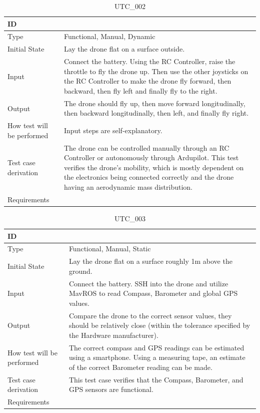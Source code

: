 \documentclass[12pt, titlepage]{article}
\begin{document}
\begin{table}[!h]
\begin{center}
\caption {UTC\_002}
\label{tab:UTC_002}
\begin{tabular}{ | m{3.2cm} | m{12.2cm} | } 
\hline
ID & \nameref{tab:UTC_002} \\ 
\hline
Type &  Functional, Manual, Dynamic  \\ 
\hline
Initial State & Lay the drone flat on a surface outside.\\ 
\hline
Input & Connect the battery. Using the RC Controller, raise the throttle to fly the drone up. Then use the other joysticks on the RC Controller to make the drone fly forward, then backward, then fly left and finally fly to the right.
 \\ 
\hline
Output &  The drone should fly up, then move forward longitudinally, then backward longitudinally, then left, and finally fly right.\\ 
\hline
How test will be performed & Input steps are self-explanatory. \\ 
\hline
Test case derivation & The drone can be controlled manually through an RC Controller or autonomously through Ardupilot. This test verifies the drone's mobility, which is mostly dependent on the electronics being connected correctly and the drone having an aerodynamic mass distribution.   \\ 
\hline
Requirements &  \\ 
\hline
\end{tabular}
\end{center}
\end{table}


\begin{table}[!h]
\begin{center}
\caption {UTC\_003}
\label{tab:UTC_003}
\begin{tabular}{ | m{3.2cm} | m{12.2cm} | } 
\hline
ID & \nameref{tab:UTC_003} \\ 
\hline
Type &  Functional, Manual, Static  \\ 
\hline
Initial State & Lay the drone flat on a surface roughly 1m above the ground.\\ 
\hline
Input & Connect the battery. SSH into the drone and utilize MavROS to read Compass, Barometer and global GPS values. 
 \\ 
\hline
Output &  Compare the drone to the correct sensor values, they should be relatively close (within the tolerance specified by the Hardware manufacturer).\\ 
\hline
How test will be performed & The correct compass and GPS readings can be estimated using a smartphone. Using a measuring tape, an estimate of the correct Barometer reading can be made.  \\ 
\hline
Test case derivation & This test case verifies that the Compass, Barometer, and GPS sensors are functional. \\ 
\hline
Requirements &  \\ 
\hline
\end{tabular}
\end{center}
\end{table}
\end{document}
